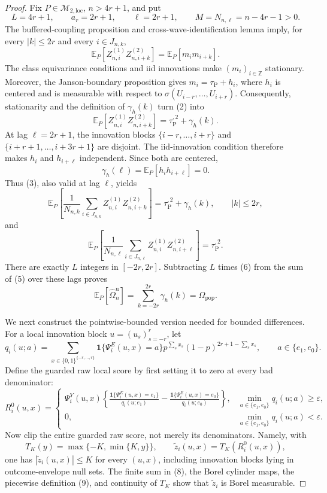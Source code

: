 \documentclass{article}
\begin{document}
\begin{proof}
Fix \(P\in\mathcal M_{2,\mathrm{loc}}\), \(n>4r+1\), and put
\[
 L=4r+1,\qquad a_r=2r+1,\qquad \ell=2r+1,
 \qquad M=N_{n,\ell}=n-4r-1>0. \tag{1}
\]
The buffered-coupling proposition and cross-wave-identification lemma imply, for every \(|k|\le 2r\) and every \(i\in J_{n,k}\),
\[
 \mathbb E_P[Z_{n,i}^{(1)}Z_{n,i+k}^{(2)}]
 =\mathbb E_P[m_i m_{i+k}]. \tag{2}
\]
The class equivariance conditions and iid innovations make \((m_i)_{i\in\mathbb Z}\) stationary.  Moreover, the Janson-boundary proposition gives \(m_i=\tau_{\mathrm P}+h_i\), where \(h_i\) is centered and is measurable with respect to \(\sigma(U_{i-r},\ldots,U_{i+r})\).  Consequently, stationarity and the definition of \(\gamma_h(k)\) turn (2) into
\[
 \mathbb E_P[Z_{n,i}^{(1)}Z_{n,i+k}^{(2)}]
 =\tau_{\mathrm P}^{,2}+\gamma_h(k). \tag{3}
\]
At lag \(\ell=2r+1\), the innovation blocks \(\{i-r,\ldots,i+r\}\) and \(\{i+r+1,\ldots,i+3r+1\}\) are disjoint.  The iid-innovation condition therefore makes \(h_i\) and \(h_{i+\ell}\) independent.  Since both are centered,
\[
 \gamma_h(\ell)=\mathbb E_P[h_i h_{i+\ell}]=0. \tag{4}
\]
Thus (3), also valid at lag \(\ell\), yields
\[
 \mathbb E_P\!\left[
  \frac{1}{N_{n,k}}\sum_{i\in J_{n,k}}
  Z_{n,i}^{(1)}Z_{n,i+k}^{(2)}
 \right]
 =\tau_{\mathrm P}^{,2}+\gamma_h(k),
 \qquad |k|\le 2r, \tag{5}
\]
and
\[
 \mathbb E_P\!\left[
  \frac{1}{N_{n,\ell}}\sum_{i\in J_{n,\ell}}
  Z_{n,i}^{(1)}Z_{n,i+\ell}^{(2)}
 \right]
 =\tau_{\mathrm P}^{,2}. \tag{6}
\]
There are exactly \(L\) integers in \([-2r,2r]\).  Subtracting \(L\) times (6) from the sum of (5) over these lags proves
\[
 \mathbb E_P[\widehat\Omega_n^{\mathrm u}]
 =\sum_{k=-2r}^{2r}\gamma_h(k)
 =\Omega_{\mathrm{pop}}. \tag{7}
\]

We next construct the pointwise-bounded version needed for bounded differences.  For a local innovation block \(u=(u_s)_{s=-r}^r\), let
\[
 q_i(u;a)=\sum_{x\in\{0,1\}^{\{-r,\ldots,r\}}}
 \mathbf 1\{\Psi_i^E(u,x)=a\}
 p^{\sum_s x_s}(1-p)^{2r+1-\sum_s x_s},
 \qquad a\in\{e_1,e_0\}. \tag{8}
\]
Define the guarded raw local score by first setting it to zero at every bad denominator:
\[
 R_i^0(u,x)=
 \begin{cases}
 \displaystyle
 \Psi_i^Y(u,x)\left\{
  \frac{\mathbf 1\{\Psi_i^E(u,x)=e_1\}}{q_i(u;e_1)}
  -\frac{\mathbf 1\{\Psi_i^E(u,x)=e_0\}}{q_i(u;e_0)}
 \right\},
 &\min_{a\in\{e_1,e_0\}}q_i(u;a)\ge\varepsilon,\\[3mm]
 0,&\min_{a\in\{e_1,e_0\}}q_i(u;a)<\varepsilon.
 \end{cases} \tag{9}
\]
Now clip the entire guarded raw score, not merely its denominators.  Namely, with
\[
 T_K(y)=\max\{-K,\min\{K,y\}\},
 \qquad \widetilde z_i(u,x)=T_K(R_i^0(u,x)), \tag{10}
\]
one has \(|\widetilde z_i(u,x)|\le K\) for every \((u,x)\), including innovation blocks lying in outcome-envelope null sets.  The finite sum in (8), the Borel cylinder maps, the piecewise definition (9), and continuity of \(T_K\) show that \(\widetilde z_i\) is Borel measurable.


\end{proof}
\end{document}
